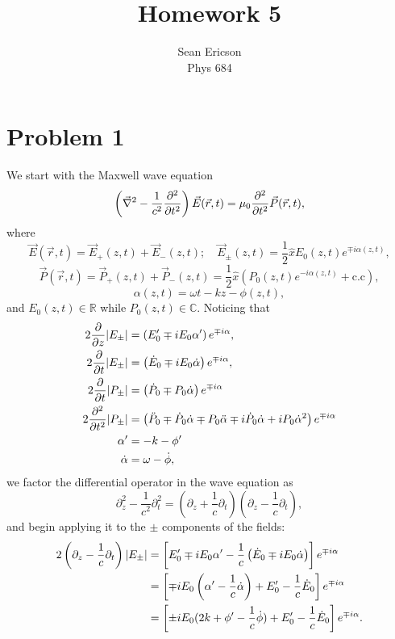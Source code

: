 \documentclass[12pt]{article}
\begin{document}
	
\title{Homework 5}
\author{Sean Ericson \\ Phys 684}
\maketitle

\section*{Problem 1}
We start with the Maxwell wave equation
\[ \left(\vec{\nabla}^2-\frac{1}{c^2}\pdv[2]{t}\right)\vec{E}(\vec{r},t) = \mu_0\pdv[2]{t}\vec{P}(\vec{r}, t), \]
where
\[ \vec{E}(\vec{r},t) = \vec{E}_+(z,t) + \vec{E}_-(z,t); \quad \vec{E}_\pm(z,t) = \frac{1}{2}\hat{x}E_0(z,t)e^{\mp i\alpha(z,t)}, \]
\[ \vec{P}(\vec{r},t) = \vec{P}_+(z,t) + \vec{P}_-(z,t) = \frac{1}{2}\hat{x}\left(P_0(z,t)e^{-i\alpha(z,t)} + \text{c.c}\right), \]
\[ \alpha(z,t) = \omega t - kz - \phi(z,t), \]
and $E_0(z,t)\in\mathbb{R}$ while $P_0(z,t)\in\mathbb{C}$.
Noticing that
\begin{align*}
    2\pdv{z}\abs{E_\pm} &= \left(E_0' \mp iE_0\alpha'\right)e^{\mp i\alpha}, \\
    2\pdv{t}\abs{E_\pm} &= \left(\dot{E}_0 \mp iE_0\dot\alpha\right)e^{\mp i\alpha}, \\
    2\pdv{t}\abs{P_\pm} &= \left(\dot{P}_0 \mp P_0\dot\alpha\right)e^{\mp i\alpha} \\
    2\pdv[2]{t}\abs{P_\pm} &= \left(\ddot{P}_0 \mp \dot{P}_0\dot\alpha \mp P_0\ddot{\alpha} \mp i\dot{P}_0\dot\alpha + iP_0\dot\alpha^2\right)e^{\mp i\alpha} \\
    \alpha' &= -k - \phi' \\
    \dot\alpha &= \omega - \dot\phi,
\end{align*}
we factor the differential operator in the wave equation as 
\[ \partial_z^2 - \frac{1}{c^2}\partial_t^2 = \left(\partial_z + \frac{1}{c}\partial_t\right)\left(\partial_z - \frac{1}{c}\partial_t\right), \]
and begin applying it to the $\pm$ components of the fields:
\begin{align*}
    2\left(\partial_z - \frac{1}{c}\partial_t\right)\abs{E_\pm} &= \left[E_0' \mp iE_0\alpha' - \frac{1}{c}\left(\dot{E}_0 \mp iE_0\dot\alpha\right)\right]e^{\mp i\alpha} \\
    &= \left[\mp iE_0\left(\alpha' - \frac{1}{c}\dot\alpha\right) + E_0' - \frac{1}{c}\dot{E}_0\right]e^{\mp i\alpha} \\
    &= \left[\pm iE_0(2k + \phi' - \frac{1}{c}\dot\phi) + E_0' - \frac{1}{c}\dot{E}_0\right]e^{\mp i\alpha}.
\end{align*}
\end{document}
